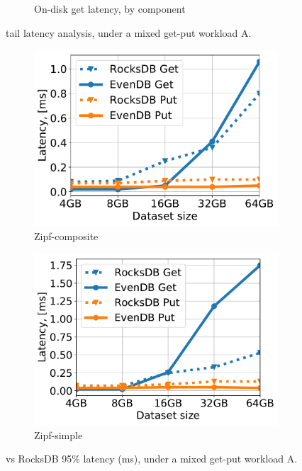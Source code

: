 {\begin{figure}[tb]
\begin{subfigure}{0.31\linewidth}
\caption{On-disk get latency, by component}
\label{fig:tail_latency:disk}
\end{subfigure}
\label{fig:tail_latency}
\caption{{\sys\/ tail latency analysis, under a mixed get-put workload A.}}
\end{figure}
}

\begin{figure}[htb]
\centering
\begin{subfigure}{0.49\linewidth}
\includegraphics[width=\textwidth]{figs/tail_flurry_line.pdf}
\caption{Zipf-composite}
\label{fig:tail_latency:co}
\end{subfigure}
\begin{subfigure}{0.49\linewidth}
\includegraphics[width=\textwidth]{figs/tail_zipf_line.pdf}
\caption{Zipf-simple}
\label{fig:tail_latency:si}
\end{subfigure}
\caption{{\sys\/ vs RocksDB 95\% latency (ms), under a mixed get-put workload A.}}
\label{fig:tail_latency}
\end{figure}

